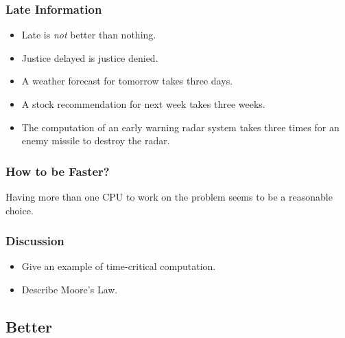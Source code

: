 \documentclass{beamer}
\begin{document}
\begin{CJK}{UTF8}{bsmi}
  \begin{frame}
    \frametitle{Late Information}
    \begin{itemize}
    \item Late is {\em not} better than nothing.
    \item Justice delayed is justice denied.
    \item A weather forecast for tomorrow takes three days.
    \item A stock recommendation for next week takes three weeks.
    \item The computation of an early warning radar system takes three
      times for an enemy missile to destroy the radar.
    \end{itemize}
  \end{frame}

  \begin{frame}
    \frametitle{How to be Faster?}
    \Huge Having more than one CPU to work on the problem seems to be a
    reasonable choice.
  \end{frame}

  \begin{frame}
    \frametitle{Discussion} \Large 
    \begin{itemize}
    \item Give an example of time-critical computation.
    \item Describe Moore's Law.
    \end{itemize}
  \end{frame}



  \subsection{Better}


\end{CJK}
\end{document}
